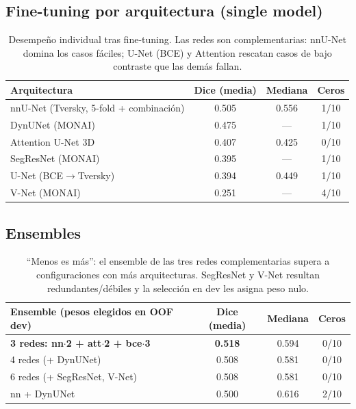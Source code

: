 \documentclass[11pt]{article}
\newcommand{\best}[1]{\textbf{#1}}
\begin{document}
\subsection{Fine-tuning por arquitectura (single model)}
\begin{table}[H]\centering
\begin{tabular}{lccc}
\toprule
Arquitectura & Dice (media) & Mediana & Ceros \\
\midrule
nnU-Net (Tversky, 5-fold + combinación) & 0.505 & 0.556 & 1/10 \\
DynUNet (MONAI)                          & 0.475 & ---   & 1/10 \\
Attention U-Net 3D                       & 0.407 & 0.425 & 0/10 \\
SegResNet (MONAI)                        & 0.395 & ---   & 1/10 \\
U-Net (BCE$\rightarrow$Tversky)          & 0.394 & 0.449 & 1/10 \\
V-Net (MONAI)                            & 0.251 & ---   & 4/10 \\
\bottomrule
\end{tabular}
\caption{Desempeño individual tras fine-tuning. Las redes son complementarias:
nnU-Net domina los casos fáciles; U-Net (BCE) y Attention rescatan casos de bajo
contraste que las demás fallan.}
\end{table}

\subsection{Ensembles}
\begin{table}[H]\centering
\begin{tabular}{lccc}
\toprule
Ensemble (pesos elegidos en OOF dev) & Dice (media) & Mediana & Ceros \\
\midrule
\best{3 redes: nn$\cdot$2 + att$\cdot$2 + bce$\cdot$3} & \best{0.518} & 0.594 & 0/10 \\
4 redes (+ DynUNet)                                    & 0.508 & 0.581 & 0/10 \\
6 redes (+ SegResNet, V-Net)                           & 0.508 & 0.581 & 0/10 \\
nn + DynUNet                                           & 0.500 & 0.616 & 2/10 \\
\bottomrule
\end{tabular}
\caption{``Menos es más'': el ensemble de las tres redes complementarias supera a
configuraciones con más arquitecturas. SegResNet y V-Net resultan redundantes/débiles
y la selección en dev les asigna peso nulo.}
\end{table}
\end{document}
